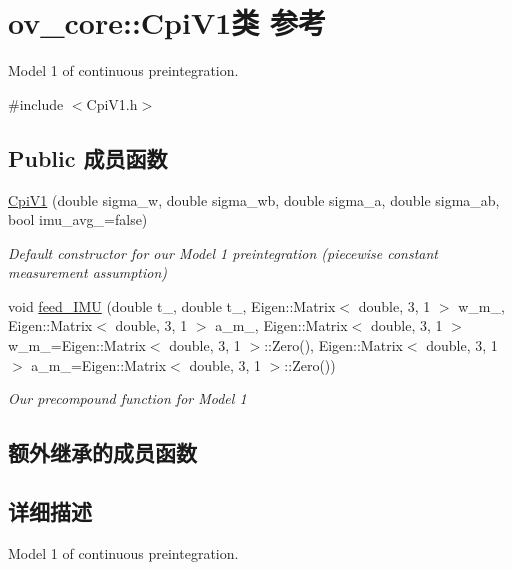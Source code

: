 \hypertarget{classov__core_1_1CpiV1}{}\section{ov\+\_\+core\+:\+:Cpi\+V1类 参考}
\label{classov__core_1_1CpiV1}


Model 1 of continuous preintegration.  




{\ttfamily \#include $<$Cpi\+V1.\+h$>$}

\subsection*{Public 成员函数}
\begin{DoxyCompactItemize}
\item 
\hyperlink{classov__core_1_1CpiV1_a34e803dec05d4a2e009ed170175d19d7}{Cpi\+V1} (double sigma\+\_\+w, double sigma\+\_\+wb, double sigma\+\_\+a, double sigma\+\_\+ab, bool imu\+\_\+avg\+\_\+=false)
\begin{DoxyCompactList}\small\item\em Default constructor for our Model 1 preintegration (piecewise constant measurement assumption) \end{DoxyCompactList}\item 
void \hyperlink{classov__core_1_1CpiV1_aafd93ac727dc176a9d5ca4b6d09d0cd2}{feed\+\_\+\+I\+MU} (double t\+\_, double t\+\_, Eigen\+::\+Matrix$<$ double, 3, 1 $>$ w\+\_\+m\+\_, Eigen\+::\+Matrix$<$ double, 3, 1 $>$ a\+\_\+m\+\_, Eigen\+::\+Matrix$<$ double, 3, 1 $>$ w\+\_\+m\+\_=Eigen\+::\+Matrix$<$ double, 3, 1 $>$\+::Zero(), Eigen\+::\+Matrix$<$ double, 3, 1 $>$ a\+\_\+m\+\_=Eigen\+::\+Matrix$<$ double, 3, 1 $>$\+::Zero())
\begin{DoxyCompactList}\small\item\em Our precompound function for Model 1 \end{DoxyCompactList}\end{DoxyCompactItemize}
\subsection*{额外继承的成员函数}


\subsection{详细描述}
Model 1 of continuous preintegration. 

